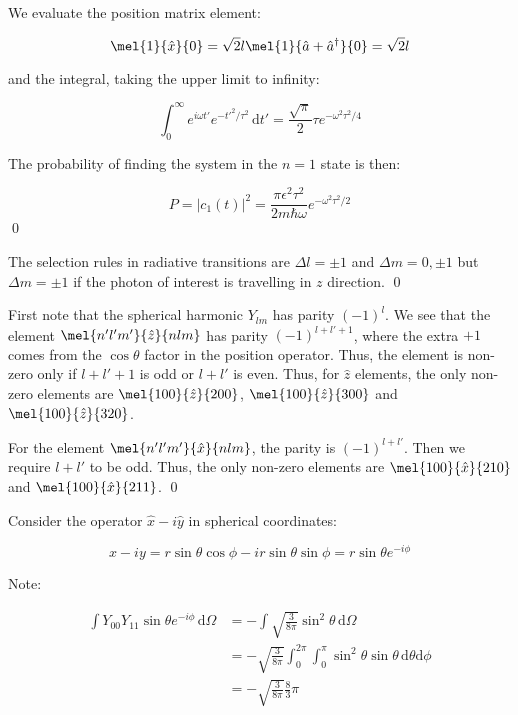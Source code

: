 \documentclass[12pt]{article}
\begin{document}
We evaluate the position matrix element:

\begin{equation}
    \mel{1}{\hat{x}}{0} = \sqrt{2}l \mel{1}{\hat{a} + \hat{a}^{\dagger}}{0} = \sqrt{2} l
\end{equation}

and the integral, taking the upper limit to infinity:

\begin{equation}
    \int_{0}^{\infty} e^{i\omega t'} e^{-t'^{2}/\tau^{2}} \, \mathrm{d}t' = \frac{\sqrt{\pi}}{2} \tau e^{-\omega^{2} \tau^{2}/4}
\end{equation}

The probability of finding the system in the $n = 1$ state is then:

\begin{equation}
    P = \left\lvert c_{1}(t) \right\rvert^{2} = \frac{\pi \epsilon^{2} \tau^{2}}{2m\hbar \omega} e^{-\omega^{2} \tau^{2}/2}
\end{equation}
\qed


The selection rules in radiative transitions are $\Delta l = \pm 1$ and $\Delta m = 0, \pm 1$ but $\Delta m = \pm 1$ if the photon of interest is travelling in $z$ direction.
\qed


First note that the spherical harmonic $Y_{lm}$ has parity $(-1)^{l}$. We see that the element $\mel{n'l'm'}{\hat{z}}{nlm}$ has parity $(-1)^{l + l' + 1}$, where the extra $+1$ comes from the $\cos{\theta}$ factor in the position operator. Thus, the element is non-zero only if $l + l' + 1$ is odd or $l + l'$ is even. Thus, for $\hat{z}$ elements, the only non-zero elements are $\mel{100}{\hat{z}}{200}$, $\mel{100}{\hat{z}}{300}$ and $\mel{100}{\hat{z}}{320}$.

For the element $\mel{n'l'm'}{\hat{x}}{nlm}$, the parity is $(-1)^{l + l'}$. Then we require $l + l'$ to be odd. Thus, the only non-zero elements are $\mel{100}{\hat{x}}{210}$ and $\mel{100}{\hat{x}}{211}$.
\qed


Consider the operator $\hat{x} - i\hat{y}$ in spherical coordinates:

\begin{equation}
    x - iy = r \sin{\theta} \cos{\phi} - i r \sin{\theta} \sin{\phi} = r \sin{\theta} e^{-i\phi}
\end{equation}

Note:

\begin{equation}
    \begin{split}
        \int Y_{00} Y_{11} \sin{\theta} e^{-i\phi} \, \mathrm{d}\Omega &= -\int \sqrt{\frac{3}{8\pi}} \sin^{2}{\theta} \, \mathrm{d}\Omega \\
        &= -\sqrt{\frac{3}{8\pi}} \int_{0}^{2\pi} \int_{0}^{\pi} \sin^{2}{\theta} \sin{\theta} \, \mathrm{d}\theta \mathrm{d}\phi \\
        &= -\sqrt{\frac{3}{8\pi}} \frac{8}{3} \pi
    \end{split}
\end{equation}
\end{document}
